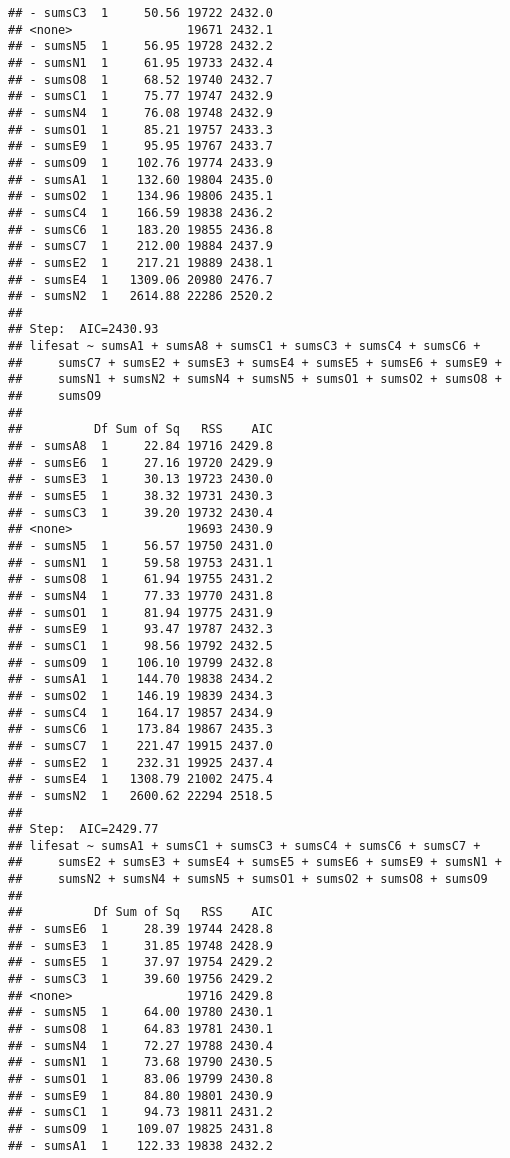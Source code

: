 \documentclass[,man,floatsintext]{apa6}
\begin{document}
\begin{verbatim}
## - sumsC3  1     50.56 19722 2432.0
## <none>                19671 2432.1
## - sumsN5  1     56.95 19728 2432.2
## - sumsN1  1     61.95 19733 2432.4
## - sumsO8  1     68.52 19740 2432.7
## - sumsC1  1     75.77 19747 2432.9
## - sumsN4  1     76.08 19748 2432.9
## - sumsO1  1     85.21 19757 2433.3
## - sumsE9  1     95.95 19767 2433.7
## - sumsO9  1    102.76 19774 2433.9
## - sumsA1  1    132.60 19804 2435.0
## - sumsO2  1    134.96 19806 2435.1
## - sumsC4  1    166.59 19838 2436.2
## - sumsC6  1    183.20 19855 2436.8
## - sumsC7  1    212.00 19884 2437.9
## - sumsE2  1    217.21 19889 2438.1
## - sumsE4  1   1309.06 20980 2476.7
## - sumsN2  1   2614.88 22286 2520.2
## 
## Step:  AIC=2430.93
## lifesat ~ sumsA1 + sumsA8 + sumsC1 + sumsC3 + sumsC4 + sumsC6 + 
##     sumsC7 + sumsE2 + sumsE3 + sumsE4 + sumsE5 + sumsE6 + sumsE9 + 
##     sumsN1 + sumsN2 + sumsN4 + sumsN5 + sumsO1 + sumsO2 + sumsO8 + 
##     sumsO9
## 
##          Df Sum of Sq   RSS    AIC
## - sumsA8  1     22.84 19716 2429.8
## - sumsE6  1     27.16 19720 2429.9
## - sumsE3  1     30.13 19723 2430.0
## - sumsE5  1     38.32 19731 2430.3
## - sumsC3  1     39.20 19732 2430.4
## <none>                19693 2430.9
## - sumsN5  1     56.57 19750 2431.0
## - sumsN1  1     59.58 19753 2431.1
## - sumsO8  1     61.94 19755 2431.2
## - sumsN4  1     77.33 19770 2431.8
## - sumsO1  1     81.94 19775 2431.9
## - sumsE9  1     93.47 19787 2432.3
## - sumsC1  1     98.56 19792 2432.5
## - sumsO9  1    106.10 19799 2432.8
## - sumsA1  1    144.70 19838 2434.2
## - sumsO2  1    146.19 19839 2434.3
## - sumsC4  1    164.17 19857 2434.9
## - sumsC6  1    173.84 19867 2435.3
## - sumsC7  1    221.47 19915 2437.0
## - sumsE2  1    232.31 19925 2437.4
## - sumsE4  1   1308.79 21002 2475.4
## - sumsN2  1   2600.62 22294 2518.5
## 
## Step:  AIC=2429.77
## lifesat ~ sumsA1 + sumsC1 + sumsC3 + sumsC4 + sumsC6 + sumsC7 + 
##     sumsE2 + sumsE3 + sumsE4 + sumsE5 + sumsE6 + sumsE9 + sumsN1 + 
##     sumsN2 + sumsN4 + sumsN5 + sumsO1 + sumsO2 + sumsO8 + sumsO9
## 
##          Df Sum of Sq   RSS    AIC
## - sumsE6  1     28.39 19744 2428.8
## - sumsE3  1     31.85 19748 2428.9
## - sumsE5  1     37.97 19754 2429.2
## - sumsC3  1     39.60 19756 2429.2
## <none>                19716 2429.8
## - sumsN5  1     64.00 19780 2430.1
## - sumsO8  1     64.83 19781 2430.1
## - sumsN4  1     72.27 19788 2430.4
## - sumsN1  1     73.68 19790 2430.5
## - sumsO1  1     83.06 19799 2430.8
## - sumsE9  1     84.80 19801 2430.9
## - sumsC1  1     94.73 19811 2431.2
## - sumsO9  1    109.07 19825 2431.8
## - sumsA1  1    122.33 19838 2432.2

\end{verbatim}
\end{document}
